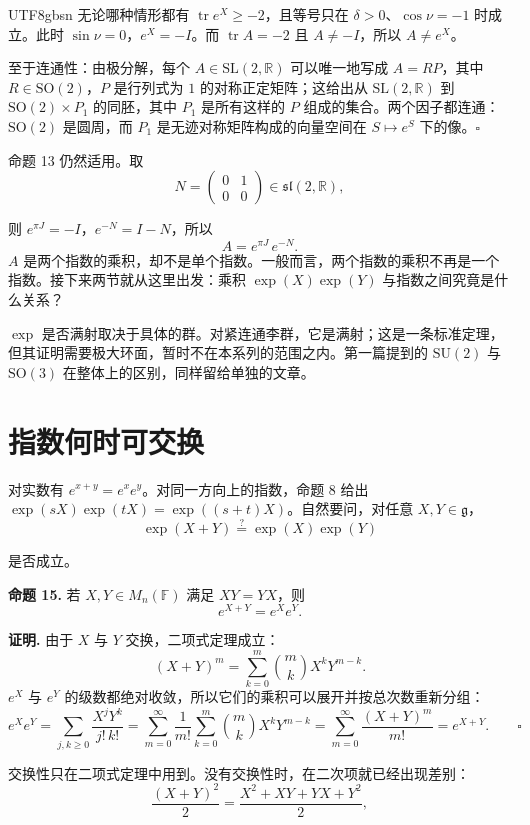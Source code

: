 \documentclass[11pt]{article}
\begin{document}
\begin{CJK*}{UTF8}{gbsn}
无论哪种情形都有 $\operatorname{tr} e^X \ge -2$，且等号只在 $\delta > 0$、$\cos \nu = -1$ 时成立。此时 $\sin \nu = 0$，$e^X = -I$。而 $\operatorname{tr} A = -2$ 且 $A \ne -I$，所以 $A \ne e^X$。

至于连通性：由极分解，每个 $A \in \mathrm{SL}(2, \mathbb{R})$ 可以唯一地写成 $A = RP$，其中 $R \in \mathrm{SO}(2)$，$P$ 是行列式为 $1$ 的对称正定矩阵；这给出从 $\mathrm{SL}(2, \mathbb{R})$ 到 $\mathrm{SO}(2) \times P_1$ 的同胚，其中 $P_1$ 是所有这样的 $P$ 组成的集合。两个因子都连通：$\mathrm{SO}(2)$ 是圆周，而 $P_1$ 是无迹对称矩阵构成的向量空间在 $S \mapsto e^S$ 下的像。$\square$

命题 13 仍然适用。取
\[
N = \begin{pmatrix} 0 & 1 \\ 0 & 0 \end{pmatrix} \in \mathfrak{sl}(2, \mathbb{R}),
\]

则 $e^{\pi J} = -I$，$e^{-N} = I - N$，所以
\[
A = e^{\pi J}\, e^{-N}.
\]
$A$ 是两个指数的乘积，却不是单个指数。一般而言，两个指数的乘积不再是一个指数。接下来两节就从这里出发：乘积 $\exp(X)\exp(Y)$ 与指数之间究竟是什么关系？

$\exp$ 是否满射取决于具体的群。对紧连通李群，它是满射；这是一条标准定理，但其证明需要极大环面，暂时不在本系列的范围之内。第一篇提到的 $\mathrm{SU}(2)$ 与 $\mathrm{SO}(3)$ 在整体上的区别，同样留给单独的文章。

\section{指数何时可交换}

对实数有 $e^{x+y} = e^x e^y$。对同一方向上的指数，命题 8 给出 $\exp(sX)\exp(tX) = \exp((s + t)X)$。自然要问，对任意 $X, Y \in \mathfrak{g}$，
\[
\exp(X + Y) \stackrel{?}{=} \exp(X) \exp(Y)
\]

是否成立。

\textbf{命题 15.} 若 $X, Y \in M_n(\mathbb{F})$ 满足 $XY = YX$，则
\[
e^{X + Y} = e^X e^Y.
\]

\textbf{证明.} 由于 $X$ 与 $Y$ 交换，二项式定理成立：
\[
(X + Y)^m = \sum_{k=0}^{m} \binom{m}{k} X^k Y^{m-k}.
\]
$e^X$ 与 $e^Y$ 的级数都绝对收敛，所以它们的乘积可以展开并按总次数重新分组：
\[
e^X e^Y = \sum_{j, k \ge 0} \frac{X^j Y^k}{j!\, k!} = \sum_{m=0}^{\infty} \frac{1}{m!} \sum_{k=0}^{m} \binom{m}{k} X^k Y^{m-k} = \sum_{m=0}^{\infty} \frac{(X + Y)^m}{m!} = e^{X+Y}. \qquad \square
\]

交换性只在二项式定理中用到。没有交换性时，在二次项就已经出现差别：
\[
\frac{(X + Y)^2}{2} = \frac{X^2 + XY + YX + Y^2}{2},
\]


\end{CJK*}
\end{document}
